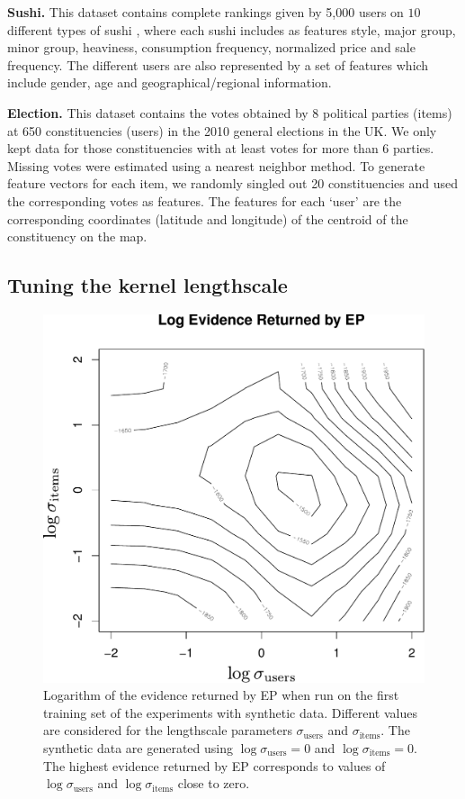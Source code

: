 {\bf Sushi.}
This dataset contains complete rankings given by 5,000 users on $10$ different types of sushi \citep{Kamishima05},
where each sushi includes as features style, major group, minor group, heaviness, consumption
frequency, normalized price and sale frequency. The different users are also represented by
a set of features which include gender, age and geographical/regional information.

{\bf Election.}
This dataset contains the votes obtained by 8 political parties (items) at 650 constituencies (users) in
the 2010 general elections in the UK.
We only kept data for those constituencies with at least votes for more than 6 parties. Missing votes
were estimated using a nearest neighbor method. To generate feature vectors for each item,
we randomly singled out 20 constituencies and used the corresponding votes as features.
The features for each `user' are the corresponding coordinates (latitude and longitude) of the centroid of the constituency on the map.


\subsection{Tuning the kernel lengthscale}

\begin{figure}
\centering
\includegraphics[scale=0.4]{figs/plotEvidence.pdf}
\caption{Logarithm of the evidence returned by EP when run on the first training set of the experiments with synthetic data.
Different values are considered for the lengthscale parameters $\sigma_\text{users}$ and $\sigma_\text{items}$.
The synthetic data are generated using $\log \sigma_\text{users} = 0$ and $\log \sigma_\text{items} = 0$.
The highest evidence returned by EP corresponds to values of $\log \sigma_\text{users}$ and
$\log \sigma_\text{items}$ close to zero.}\label{fig:experimentEvidence}
\end{figure}

